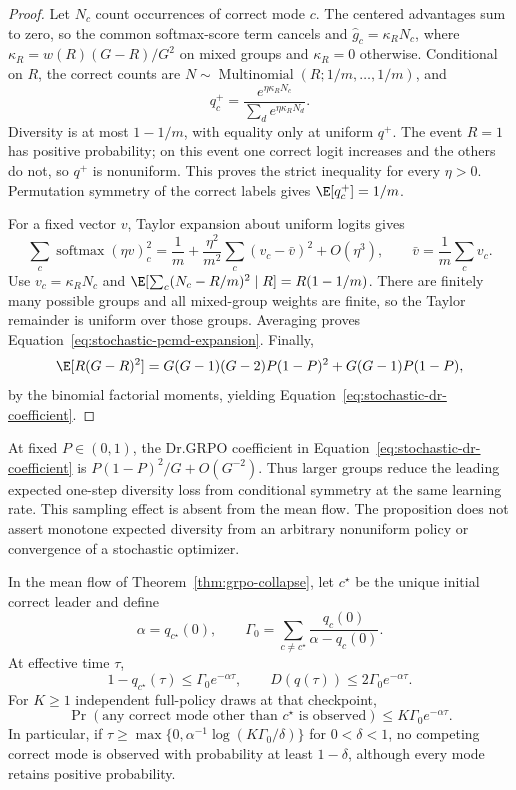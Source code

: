 \begin{proof}
\enforcehalffinalproseline
Let $N_c$ count occurrences of correct mode $c$. The centered advantages
sum to zero, so the common softmax-score term cancels and
$\widehat g_c=\kappa_RN_c$, where
$\kappa_R=w(R)(G-R)/G^2$ on mixed groups and $\kappa_R=0$ otherwise.
Conditional on $R$, the correct counts are
$N\sim\operatorname{Multinomial}(R;1/m,\ldots,1/m)$, and
\[
 q_c^+=\frac{e^{\eta\kappa_RN_c}}{\sum_de^{\eta\kappa_RN_d}}.
\]
Diversity is at most $1-1/m$, with equality only at uniform $q^+$.
The event $R=1$ has positive probability; on this event one correct logit
increases and the others do not, so $q^+$ is nonuniform. This proves the
strict inequality for every $\eta>0$. Permutation symmetry of the correct
labels gives $\E[q_c^+]=1/m$.

For a fixed vector $v$, Taylor expansion about uniform logits gives
\[
 \sum_c\operatorname{softmax}(\eta v)_c^2
 =\frac1m+\frac{\eta^2}{m^2}\sum_c(v_c-\bar v)^2+O(\eta^3),
 \qquad \bar v=\frac1m\sum_cv_c.
\]
Use $v_c=\kappa_RN_c$ and
$\E[\sum_c(N_c-R/m)^2\mid R]=R(1-1/m)$.
There are finitely many possible groups and all mixed-group weights are
finite, so the Taylor remainder is uniform over those groups. Averaging
proves Equation~\eqref{eq:stochastic-pcmd-expansion}.
Finally,
\[
 \E[R(G-R)^2]
 =G(G-1)(G-2)P(1-P)^2+G(G-1)P(1-P),
\]
by the binomial factorial moments, yielding
Equation~\eqref{eq:stochastic-dr-coefficient}.
\end{proof}

At fixed $P\in(0,1)$, the Dr.GRPO coefficient in
Equation~\eqref{eq:stochastic-dr-coefficient} is
$P(1-P)^2/G+O(G^{-2})$. Thus larger groups reduce the leading expected
one-step diversity loss from conditional symmetry at the same learning rate.
This sampling effect is absent from the mean flow. The proposition does not
assert monotone expected diversity from an arbitrary nonuniform policy or
convergence of a stochastic optimizer.

\begin{corollary}
\enforcehalffinalproseline
\label{cor:finite-budget-invisibility}
In the mean flow of Theorem~\ref{thm:grpo-collapse}, let $c^\star$ be the
unique initial correct leader and define
\[
 \alpha=q_{c^\star}(0),
 \qquad
 \Gamma_0=\sum_{c\ne c^\star}
             \frac{q_c(0)}{\alpha-q_c(0)}.
\]
At effective time $\tau$,
\begin{equation}
 1-q_{c^\star}(\tau)\le\Gamma_0e^{-\alpha\tau},
 \qquad D(q(\tau))\le2\Gamma_0e^{-\alpha\tau}.
 \label{eq:finite-minority-bound}
\end{equation}
For $K\ge1$ independent full-policy draws at that checkpoint,
\begin{equation}
 \Pr(\text{any correct mode other than }c^\star\text{ is observed})
 \le K\Gamma_0e^{-\alpha\tau}.
 \label{eq:finite-inference-visibility}
\end{equation}
In particular, if
$\tau\ge\max\{0,\alpha^{-1}\log(K\Gamma_0/\delta)\}$ for
$0<\delta<1$, no competing correct mode is observed with probability at
least $1-\delta$, although every mode retains positive probability.
\end{corollary}


